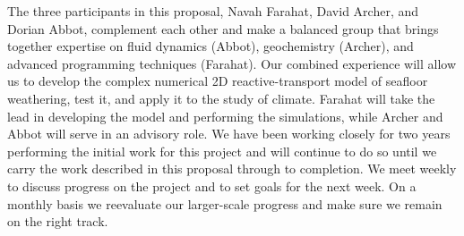 \documentclass[authoryear,round,12pt]{article}
\begin{document}
The three participants in this proposal, Navah Farahat, David Archer,
and Dorian Abbot, complement each other and make a balanced group that
brings together expertise on fluid dynamics (Abbot), geochemistry
(Archer), and advanced programming techniques (Farahat). Our combined
experience will allow us to develop the complex numerical 2D
reactive-transport model of seafloor weathering, test it, and apply it
to the study of climate. Farahat will take the lead in developing the
model and performing the simulations, while Archer and Abbot will
serve in an advisory role. We have been working closely for two years
performing the initial work for this project and will continue to do
so until we carry the work described in this proposal through to
completion. We meet weekly to discuss progress on the project and to
set goals for the next week. On a monthly basis we reevaluate our
larger-scale progress and make sure we remain on the right track.




\clearpage
{}
\addtocounter{section}{1}


{}
\end{document}
